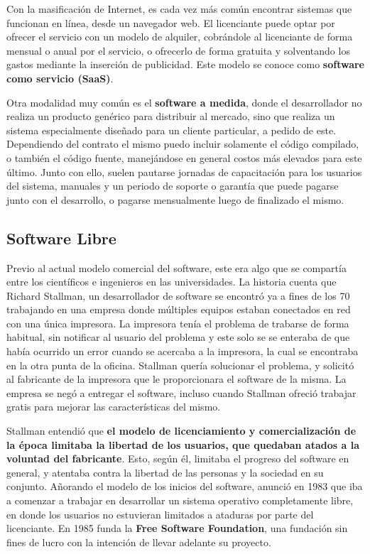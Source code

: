  Con la masificación de Internet, es
cada vez más común encontrar sistemas que funcionan en línea, desde un navegador
web. El licenciante puede optar por ofrecer el servicio con un modelo de
alquiler, cobrándole al licenciante de forma mensual o anual por el servicio, o
ofrecerlo de forma gratuita y solventando los gastos mediante la inserción de
publicidad. Este modelo se conoce como \textbf{ software como servicio (SaaS)}.

Otra modalidad muy común es el \textbf{software a medida}, donde el
desarrollador no realiza un producto genérico para distribuir al mercado, sino
que realiza un sistema especialmente diseñado para un cliente particular, a
pedido de este. Dependiendo del contrato el mismo puedo incluir solamente el
código compilado, o también el código fuente, manejándose en general costos más
elevados para este último. Junto con ello, suelen pautarse jornadas de
capacitación para los usuarios del sistema, manuales y un periodo de soporte o
garantía que puede pagarse junto con el desarrollo, o pagarse mensualmente luego
de finalizado el mismo.\autocite{saxena_2017}


\subsection{Software Libre}
\label{chap:informatica:subsec:software_libre}

 Previo al actual modelo
comercial del software, este era algo que se compartía entre los científicos e
ingenieros en las universidades. La historia cuenta que Richard Stallman, un
desarrollador de software se encontró ya a fines de los 70 trabajando en una
empresa donde múltiples equipos estaban conectados en red con una única
impresora. La impresora tenía el problema de trabarse de forma habitual, sin
notificar al usuario del problema y este solo se se enteraba de que había
ocurrido un error cuando se acercaba a la impresora, la cual se encontraba en la
otra punta de la oficina. Stallman quería solucionar el problema, y solicitó al
fabricante de la impresora que le proporcionara el software de la misma. La
empresa se negó a entregar el software, incluso cuando Stallman ofreció trabajar
gratis para mejorar las características del mismo.

Stallman entendió que \textbf{el modelo de licenciamiento y comercialización de
la época limitaba la libertad de los usuarios, que quedaban atados a la voluntad
del fabricante}. Esto, según él, limitaba el progreso del software en general, y
atentaba contra la libertad de las personas y la sociedad en su conjunto.
Añorando el modelo de los inicios del software, anunció en 1983 que iba a
comenzar a trabajar en desarrollar un sistema operativo completamente libre, en
donde los usuarios no estuvieran limitados a ataduras por parte del licenciante.
En 1985 funda la \textbf{Free Software Foundation}, una fundación sin fines de
lucro con la intención de llevar adelante su proyecto.

